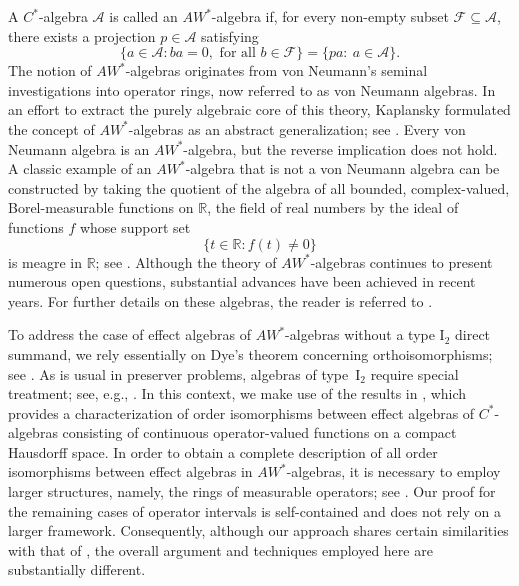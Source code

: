 \documentclass[12pt]{amsart}
\theoremstyle{definition}
\theoremstyle{remark}
\numberwithin{equation}{section}
\begin{document}
A $C^*$-algebra $\mathcal{A}$ is called an $AW^*$-algebra if, for every non-empty subset $\mathcal{F} \subseteq \mathcal{A}$, there exists a projection $p \in \mathcal{A}$ satisfying 
$$
\{a \in \mathcal{A} : ba = 0, \text{ for all } b \in \mathcal{F}\} =\{pa: \ a\in\mathcal{A}\}.
$$
The notion of $AW^*$-algebras originates from von Neumann’s seminal investigations into operator rings, now referred to as von Neumann algebras. In an effort to extract the purely algebraic core of this theory, Kaplansky formulated the concept of $AW^*$-algebras as an abstract generalization; see \cite{Kaplansky}. Every von Neumann algebra is  an $AW^*$-algebra, but the reverse implication does not hold. A classic  example of an $AW^*$-algebra that is not a von Neumann algebra can be constructed by taking the quotient of the algebra of all bounded, complex-valued, Borel-measurable functions on $\mathbb{R}$,  the field of real numbers by the ideal of functions $f$ whose support set $$\{t\in \mathbb{R}: f(t)\neq0 \}$$  is meagre in $\mathbb{R}$; see \cite{Saito-wright}. Although the theory of $AW^*$-algebras continues to present numerous open questions, substantial advances have been achieved in recent years.  For further details on these algebras, the reader is referred to \cite{Berberian, Saito-wright}.







To address the case of effect algebras of $AW^*$-algebras without a type $\mathrm{I}_2$ direct summand, we rely essentially on Dye’s theorem concerning orthoisomorphisms; see \cite[Theorem 4.3]{Hamhalter}. As is usual in preserver problems, algebras of type~$\mathrm{I}_2$ require special treatment; see, e.g., \cite{Our2, El Khatiri, mori}. In this context, we make use of the results in \cite{Our}, which provides a characterization of order isomorphisms between effect algebras of $C^*$-algebras consisting of continuous operator-valued functions on a compact Hausdorff space. In order to obtain a complete description of all order isomorphisms between effect algebras in $AW^*$-algebras, it is necessary to employ larger structures, namely, the rings of measurable operators; see \cite{Berberian, Berberian1, Berberian2}. Our proof for the remaining cases of operator intervals is self-contained and does not rely on a larger framework. Consequently, although our approach shares certain similarities with that of \cite{mori}, the overall argument and techniques employed here are substantially different.
\end{document}
